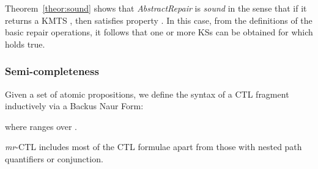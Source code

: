 Theorem~\ref{theor:sound} shows that \emph{AbstractRepair} 
is \emph{sound} in the sense that if it returns a KMTS 
, then  satisfies 
property .  In this case, from the definitions of the basic 
repair operations, it follows that one or more KSs can be 
obtained for which  holds true.    



\subsubsection{Semi-completeness}
\label{subsubsec:alg_completeness}

\begin{defi}
Given a set  of atomic propositions, we define the syntax of 
a CTL fragment inductively via a Backus Naur Form:  

where  ranges over .  
\end{defi}

\emph{mr}-CTL includes most of the CTL formulae apart from those with nested 
path quantifiers or conjunction.


